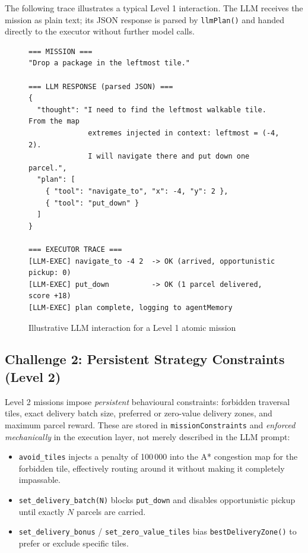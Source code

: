 \documentclass[10pt,a4paper,twocolumn]{article}
\begin{document}
\noindent The following trace illustrates a typical Level 1 interaction.
The LLM receives the mission as plain text; its JSON response is parsed by
\texttt{llmPlan()} and handed directly to the executor without further model calls.

\begin{figure}[H]
\caption{Illustrative LLM interaction for a Level 1 atomic mission}
\begin{lstlisting}[language={}]
=== MISSION ===
"Drop a package in the leftmost tile."

=== LLM RESPONSE (parsed JSON) ===
{
  "thought": "I need to find the leftmost walkable tile. From the map
              extremes injected in context: leftmost = (-4, 2).
              I will navigate there and put down one parcel.",
  "plan": [
    { "tool": "navigate_to", "x": -4, "y": 2 },
    { "tool": "put_down" }
  ]
}

=== EXECUTOR TRACE ===
[LLM-EXEC] navigate_to -4 2  -> OK (arrived, opportunistic pickup: 0)
[LLM-EXEC] put_down          -> OK (1 parcel delivered, score +18)
[LLM-EXEC] plan complete, logging to agentMemory
\end{lstlisting}
\end{figure}

\subsection{Challenge 2: Persistent Strategy Constraints (Level 2)}

Level 2 missions impose \emph{persistent} behavioural constraints:
forbidden traversal tiles, exact delivery batch size, preferred or
zero-value delivery zones, and maximum parcel reward.  These are stored in
\texttt{missionConstraints} and \emph{enforced mechanically} in the execution
layer, not merely described in the LLM prompt:

\begin{itemize}[noitemsep]
  \item \texttt{avoid\_tiles} injects a penalty of 100\,000 into the A*
        congestion map for the forbidden tile, effectively routing around it
        without making it completely impassable.
  \item \texttt{set\_delivery\_batch(N)} blocks \texttt{put\_down} and
        disables opportunistic pickup until exactly $N$ parcels are carried.
  \item \texttt{set\_delivery\_bonus} / \texttt{set\_zero\_value\_tiles} bias
        \texttt{bestDeliveryZone()} to prefer or exclude specific tiles.
\end{itemize}
\end{document}

